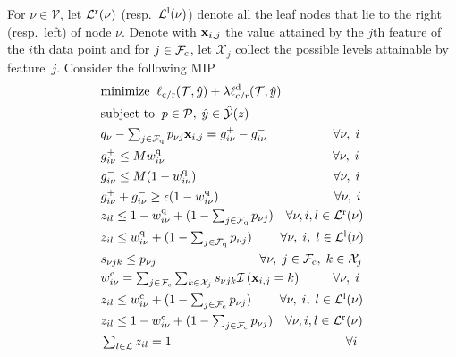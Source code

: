\documentclass[letterpaper]{article} %
\theoremstyle{definition}
\newcommand{\sets}[1]{\ensuremath{\mathcal{#1}}}
\newcommand{\1}{\ensuremath{{\rm e}}} %
\newcommand{\I}[1]{\ensuremath{\mathcal{I}\left(#1\right)}} %
\begin{document}
 For $\nu \in \sets V$, let $\sets L^{\rm r}(\nu)$ (resp.\ $\sets L^{\rm l}(\nu)$) denote all the leaf nodes that lie to the right (resp.\ left) of node $\nu$. Denote with ${\bf x}_{i,j}$ the value attained by the $j$th feature of the $i$th data point and for $j \in \sets F_{\rm c}$, let $\sets X_j$ collect the possible levels attainable by feature~$j$. Consider the following MIP
%
\begin{subequations}
\begin{align}%
&\text{minimize} \;\;  \ell_{\rm c/\rm r}(\mathcal T, \hat y) + \lambda \ell^{\rm d}_{\rm c/\rm r}(\mathcal T,\hat y) \label{eq:mip_a}\\
&\text{subject to} \;\; p \in \mathcal P, \; \hat y \in \hat{\mathcal Y}(z) \label{eq:mip_b} \\
&  \textstyle q_\nu - \sum_{j \in \sets F_{{\rm q}}} p_{\nu j} {\bf x}_{i,j}= g_{i \nu}^+ - g_{i \nu}^- \quad \qquad \qquad \,\, \forall \nu , \; i 
\label{eq:mip_c} \\
&  \textstyle g_{i \nu}^+ \leq M w_{i \nu}^{\rm q} \; \, \qquad \qquad \qquad \quad \qquad \qquad \qquad \forall \nu, \;  i  
\label{eq:mip_d} \\
&  \textstyle g_{i \nu}^- \leq M (1-w_{i \nu}^{\rm q} )  \qquad \qquad \qquad  \qquad   \quad  \quad \quad \forall \nu, \; i
\label{eq:mip_e}\\ 
&  \textstyle g_{i \nu}^+ + g_{i\nu}^- \geq \epsilon (1-w_{i \nu}^{\rm q}) \quad \qquad \qquad \qquad \;  \quad \quad \forall \nu, \; i 
\label{eq:mip_f}\\
&  \textstyle z_{il} \leq  1-w_{i\nu}^{\rm q}+(1-\sum_{j \in \sets F_{\rm q}} p_{\nu j})  \quad \forall \nu,i,l \in {\sets L}^{\rm r}(\nu) 
\label{eq:mip_g}\\ 
&  \textstyle z_{il} \leq  w_{i\nu}^{\rm q}+ (1-\sum_{j \in \sets F_{\rm q}} p_{\nu j}) \quad \quad \; \forall \nu, \; i, \; l \in {\sets L}^{\rm l}(\nu) 
\label{eq:mip_h} \\
& s_{\nu j k} \leq p_{\nu j} \qquad  \qquad \qquad \qquad \; \forall \nu, \; j \in \sets F_{\rm c}, \; k \in \sets X_j 
\label{eq:mip_i} \\
& w_{i\nu}^{\rm c} = \textstyle \sum_{j\in \sets F_{\rm c}} \sum_{k \in \sets X_j} s_{\nu j k}\I{{\bf x}_{i,j}=k} \quad  \quad \; \; \forall \nu, \;  i
\label{eq:mip_j}\\
&  \textstyle z_{il} \leq  w^{\rm c}_{i \nu} + (1-\sum_{j \in \sets F_{\rm c}} p_{\nu j}) \quad \quad \; \forall \nu, \; i, \; l \in {\sets L}^{\rm l}(\nu)
\label{eq:mip_k}\\
&  \textstyle z_{il} \leq 1 - w^{\rm c}_{i \nu} + (1-\sum_{j \in \sets F_{\rm c}} p_{\nu j}) \quad \forall \nu,i, l \in {\sets L}^{\rm r}(\nu) 
\label{eq:mip_l}\\
& \textstyle \sum_{l \in {\sets L}} z_{il} = 1 \qquad  \qquad \qquad  \qquad \qquad   \qquad \qquad \forall i 
\label{eq:mip_m}
\end{align}
\label{eq:mip}
\end{subequations}
\end{document}
